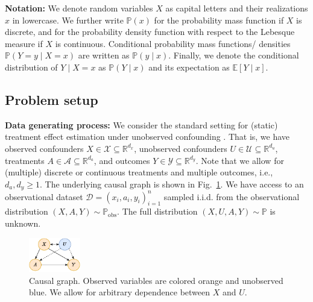 \documentclass{article} %
\newcommand{\R}{\mathbb{R}}
\theoremstyle{definition}
\theoremstyle{plain}
\begin{document}
\textbf{Notation:} We denote random variables $X$ as capital letters and their realizations $x$ in lowercase. We further write $\mathbb{P}(x)$ for the probability mass function if $X$ is discrete, and for the probability density function with respect to the Lebesque measure if $X$ is continuous. Conditional probability mass functions/ densities $\mathbb{P}(Y = y \mid X = x)$ are written as $\mathbb{P}(y \mid x)$. Finally, we denote the conditional distribution of $Y \mid X = x$ as $\mathbb{P}(Y \mid x)$ and its expectation as $\mathbb{E}[Y \mid x]$.

\subsection{Problem setup}

\textbf{Data generating process:} We consider the standard setting for (static) treatment effect estimation under unobserved confounding \citep{Dorn.2022}. That is, we have observed confounders $X \in \mathcal{X} \subseteq \R^{d_x}$, unobserved confounders $U \in \mathcal{U} \subseteq \R^{d_u}$, treatments $A \in \mathcal{A} \subseteq \R^{d_a}$, and outcomes $Y \in \mathcal{Y} \subseteq \R^{d_y}$. Note that we allow for (multiple) discrete or continuous treatments and multiple outcomes, i.e., $d_a, d_y \geq 1$. The underlying causal graph is shown in Fig.~\ref{fig:causal_graph}. We have access to an observational dataset $\mathcal{D} = (x_i, a_i, y_i)_{i=1}^n$ sampled i.i.d. from the observational distribution $(X, A, Y) \sim \mathbb{P}_\mathrm{obs}$. The full distribution $(X, U, A, Y) \sim \mathbb{P}$ is unknown.

\begin{figure}
\vspace{-0.7cm}
\begin{center}
\includegraphics[width=0.20\textwidth]{figures/causal_graph.pdf}
\end{center}\vspace{-0.4cm}
\caption{Causal graph. Observed variables are colored orange and unobserved blue. We allow for arbitrary dependence between $X$ and $U$.}
\label{fig:causal_graph}
\vspace{-0.9cm}
\end{figure}
\end{document}
